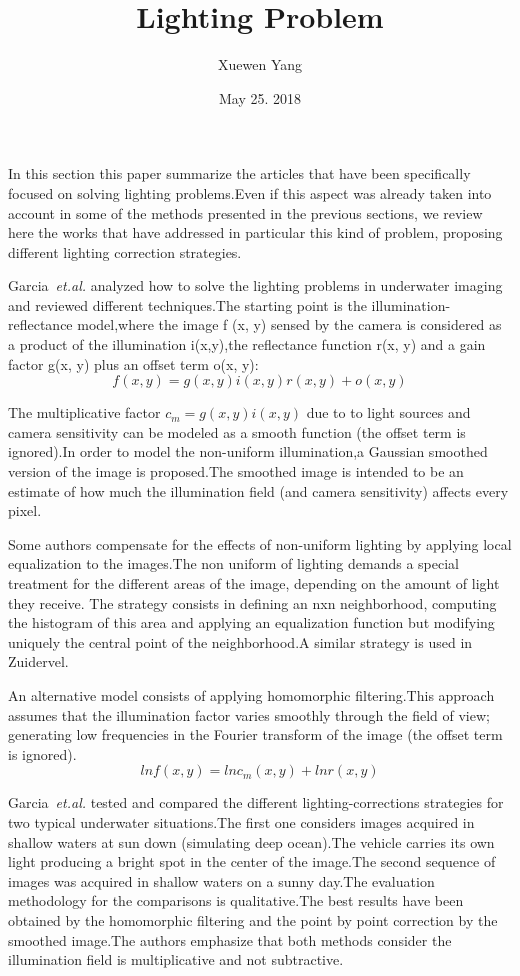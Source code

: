 \documentclass{article}
\author{Xuewen Yang}
\date{May 25. 2018}
\title{Lighting Problem}
\begin{document}
\maketitle
\large
In this section this paper summarize the articles that have been specifically focused on solving lighting problems.Even if this aspect was already taken into account in some of the methods presented in the previous sections, we review here the works that have addressed in particular this kind of problem, proposing different lighting correction strategies.

Garcia~\emph{et.al.}\cite{Garcia2003On} analyzed how to solve the lighting problems in underwater imaging and reviewed different techniques.The starting point is the illumination-reflectance model,where the image f (x, y) sensed by the camera is considered as a product of the illumination i(x,y),the reflectance function r(x, y) and a gain factor g(x, y) plus an offset term o(x, y):
\begin{equation}
f(x,y)=g(x,y)i(x,y)r(x,y)+o(x,y)
\end{equation}

The multiplicative factor $c_m=g(x,y)i(x,y)$ due to to light sources and camera sensitivity can be modeled as a smooth function (the offset term is ignored).In
order to model the non-uniform illumination,a Gaussian smoothed version of the image is proposed.The smoothed image is intended to be an estimate of how much the illumination field (and camera sensitivity) affects every pixel.

Some authors compensate for the effects of non-uniform lighting by applying local equalization to the images.The non uniform of lighting demands a special treatment for the different areas of the image, depending on the amount of light they receive. The strategy consists in defining an nxn neighborhood, computing the histogram of this area and applying an equalization function but modifying uniquely the central point of the neighborhood.A similar strategy is used in Zuidervel.

An alternative model consists of applying homomorphic filtering.This approach assumes that the illumination factor varies smoothly through the field of view; generating low frequencies in the Fourier transform of the image (the offset term is ignored).
\begin{equation}
lnf(x,y)=lnc_m(x,y)+lnr(x,y)
\end{equation}

Garcia~\emph{et.al.} tested and compared the different lighting-corrections strategies for two typical underwater situations.The first one considers images acquired in shallow waters at sun down (simulating deep ocean).The vehicle carries its own light producing a bright spot in the center of the image.The second sequence of images was acquired in shallow waters on a sunny day.The evaluation methodology for the comparisons is qualitative.The best results have been obtained by the homomorphic filtering and the point by point correction by the smoothed image.The authors emphasize that both methods consider the illumination field is multiplicative and not subtractive.

\end{document}
